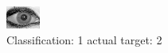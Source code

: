\begin{figure}[h!]
\begin{center}
\includegraphics[width=0.60\columnwidth]{figures/ID2021_class_1_target_2.png}
\end{center}
\caption{ Classification: 1 actual target: 2}
\label{fig:ID2021_class_1_target_2}
\end{figure}
